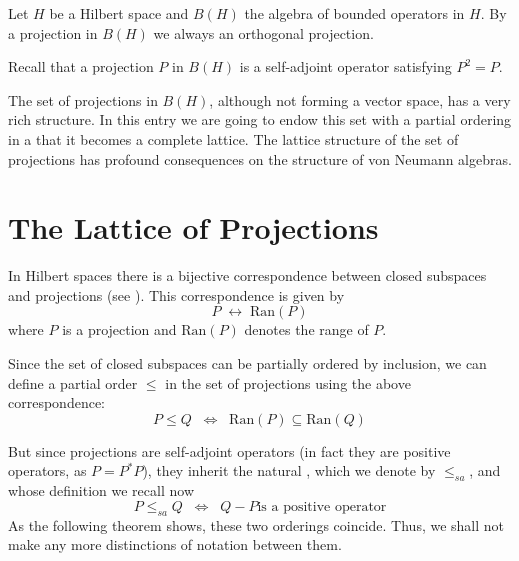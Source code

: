 \documentclass[12pt]{article}
\begin{document}

Let $H$ be a Hilbert space and $B(H)$ the algebra of bounded operators in $H$. By a projection in $B(H)$ we always  an orthogonal projection.

Recall that a projection $P$ in $B(H)$ is a  self-adjoint operator satisfying $P^2=P$.

The set of projections in $B(H)$, although not forming a vector space, has a very rich structure. In this entry we are going to endow this set with a partial ordering in a  that it becomes a complete lattice. The lattice structure of the set of projections has profound consequences on the structure of von Neumann algebras.

\section{ The Lattice of Projections}

In Hilbert spaces there is a bijective correspondence between closed subspaces and projections (see ). This correspondence is given by
\begin{displaymath}
P \;\longleftrightarrow\; \mathrm{Ran}(P)
\end{displaymath}
where $P$ is a projection and $\mathrm{Ran}(P)$ denotes the range of $P$.

Since the set of closed subspaces can be partially ordered by inclusion, we can define a partial order $\leq$ in the set of projections using the above correspondence:
\begin{displaymath}
P \leq Q\;\; \Longleftrightarrow \;\;\mathrm{Ran}(P) \subseteq \mathrm{Ran}(Q)
\end{displaymath}


But since projections are self-adjoint operators (in fact they are positive operators, as $P=P^*P$), they inherit the natural , which we denote by $\leq_{sa}$, and whose definition we recall now
\begin{displaymath}
P \leq_{sa} Q \;\; \Longleftrightarrow \;\; Q - P \text{is a positive operator}
\end{displaymath}
As the following theorem shows, these two orderings coincide. Thus, we shall not make any more distinctions of notation between them.
\end{document}
